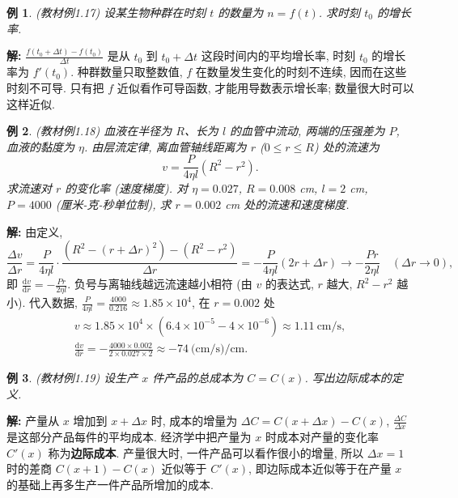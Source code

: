 \documentclass[UTF8,openany]{ctexbook}
\theoremstyle{chinesetextbook}
\newtheorem{example}{例}[section]
\newenvironment{cnsolution}{\par\indent\textbf{解:} \ignorespaces}{\par}
\newcommand{\dd}{\mathrm d}
\begin{document}
\begin{example}\label{ex:c2-1-17}
\textnormal{(教材例1.17)} 设某生物种群在时刻 $t$ 的数量为 $n=f(t)$. 求时刻 $t_0$ 的增长率.
\end{example}
\begin{cnsolution}
$\displaystyle\frac{f(t_0+\Delta t)-f(t_0)}{\Delta t}$ 是从 $t_0$ 到 $t_0+\Delta t$ 这段时间内的平均增长率, 时刻 $t_0$ 的增长率为 $f'(t_0)$. 种群数量只取整数值, $f$ 在数量发生变化的时刻不连续, 因而在这些时刻不可导. 只有把 $f$ 近似看作可导函数, 才能用导数表示增长率; 数量很大时可以这样近似.
\end{cnsolution}
\begin{example}\label{ex:c2-1-18}
\textnormal{(教材例1.18)} 血液在半径为 $R$、长为 $l$ 的血管中流动, 两端的压强差为 $P$, 血液的黏度为 $\eta$. 由层流定律, 离血管轴线距离为 $r$ ($0\le r\le R$) 处的流速为
\[
v=\frac P{4\eta l}\left(R^2-r^2\right).
\]
求流速对 $r$ 的变化率 (速度梯度). 对 $\eta=0.027$, $R=0.008$ cm, $l=2$ cm, $P=4000$ (厘米-克-秒单位制), 求 $r=0.002$ cm 处的流速和速度梯度.
\end{example}
\begin{cnsolution}
由定义,
\[
\frac{\Delta v}{\Delta r}=\frac P{4\eta l}\cdot\frac{\left(R^2-(r+\Delta r)^2\right)-\left(R^2-r^2\right)}{\Delta r}=-\frac P{4\eta l}(2r+\Delta r)\to-\frac{Pr}{2\eta l}\quad(\Delta r\to0),
\]
即 $\displaystyle\frac{\dd v}{\dd r}=-\frac{Pr}{2\eta l}$. 负号与离轴线越远流速越小相符 (由 $v$ 的表达式, $r$ 越大, $R^2-r^2$ 越小). 代入数据, $\displaystyle\frac P{4\eta l}=\frac{4000}{0.216}\approx1.85\times10^4$, 在 $r=0.002$ 处
\[
\begin{gathered}
v\approx1.85\times10^4\times\left(6.4\times10^{-5}-4\times10^{-6}\right)\approx1.11\ \text{cm/s},\\
\frac{\dd v}{\dd r}=-\frac{4000\times0.002}{2\times0.027\times2}\approx-74\ \text{(cm/s)/cm}.
\end{gathered}
\]
\end{cnsolution}
\begin{example}\label{ex:c2-1-19}
\textnormal{(教材例1.19)} 设生产 $x$ 件产品的总成本为 $C=C(x)$. 写出边际成本的定义.
\end{example}
\begin{cnsolution}
产量从 $x$ 增加到 $x+\Delta x$ 时, 成本的增量为 $\Delta C=C(x+\Delta x)-C(x)$, $\displaystyle\frac{\Delta C}{\Delta x}$ 是这部分产品每件的平均成本. 经济学中把产量为 $x$ 时成本对产量的变化率 $C'(x)$ 称为\textbf{边际成本}. 产量很大时, 一件产品可以看作很小的增量, 所以 $\Delta x=1$ 时的差商 $C(x+1)-C(x)$ 近似等于 $C'(x)$, 即边际成本近似等于在产量 $x$ 的基础上再多生产一件产品所增加的成本.
\end{cnsolution}
\end{document}
